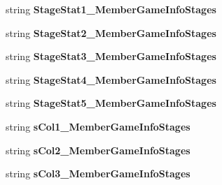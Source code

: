 \begin{DoxyCompactItemize}
\item 
string {\bfseries Stage\+Stat1\+\_\+\+Member\+Game\+Info\+Stages}\hypertarget{a00111_a3653c38549494fb3f2391a8203a1a59c}{}\label{a00111_a3653c38549494fb3f2391a8203a1a59c}

\item 
string {\bfseries Stage\+Stat2\+\_\+\+Member\+Game\+Info\+Stages}\hypertarget{a00111_a383757809e2fbd22de8c5bb2de9146e3}{}\label{a00111_a383757809e2fbd22de8c5bb2de9146e3}

\item 
string {\bfseries Stage\+Stat3\+\_\+\+Member\+Game\+Info\+Stages}\hypertarget{a00111_a57ecfe19bcebc435f1429cd1a3ee4e61}{}\label{a00111_a57ecfe19bcebc435f1429cd1a3ee4e61}

\item 
string {\bfseries Stage\+Stat4\+\_\+\+Member\+Game\+Info\+Stages}\hypertarget{a00111_a571eb0417400e37b82b1749e09401481}{}\label{a00111_a571eb0417400e37b82b1749e09401481}

\item 
string {\bfseries Stage\+Stat5\+\_\+\+Member\+Game\+Info\+Stages}\hypertarget{a00111_a3f69c66b9c8e74e6a568c0918a1316c0}{}\label{a00111_a3f69c66b9c8e74e6a568c0918a1316c0}

\item 
string {\bfseries s\+Col1\+\_\+\+Member\+Game\+Info\+Stages}\hypertarget{a00111_a00b7241bd748c8e630a3053f15f2158c}{}\label{a00111_a00b7241bd748c8e630a3053f15f2158c}

\item 
string {\bfseries s\+Col2\+\_\+\+Member\+Game\+Info\+Stages}\hypertarget{a00111_af685300d58953a48f976d4de4ef3638d}{}\label{a00111_af685300d58953a48f976d4de4ef3638d}

\item 
string {\bfseries s\+Col3\+\_\+\+Member\+Game\+Info\+Stages}\hypertarget{a00111_af34176745ebe428edbb9a5265a2f107d}{}\label{a00111_af34176745ebe428edbb9a5265a2f107d}


\end{DoxyCompactItemize}
